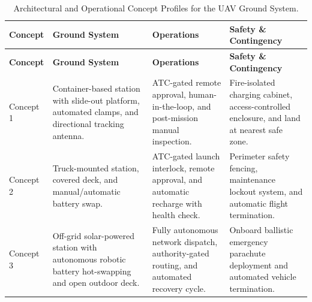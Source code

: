 {
\small
\setlength{\LTleft}{0pt}
\setlength{\LTright}{0pt}

\begin{longtable}{@{}
>{\raggedright\arraybackslash}p{}
>{\raggedright\arraybackslash}p{}
>{\raggedright\arraybackslash}p{}
>{\raggedright\arraybackslash}p{}
@{}}
\caption{Architectural and Operational Concept Profiles for the UAV Ground System.}
\label{tab:UAVConcepts} \\
\toprule
\textbf{Concept} & \textbf{Ground System} & \textbf{Operations} & \textbf{Safety \& Contingency} \\
\midrule
\endfirsthead

\toprule
\textbf{Concept} & \textbf{Ground System} & \textbf{Operations} & \textbf{Safety \& Contingency} \\
\midrule
\endhead

\bottomrule
\endfoot

Concept 1 & 
Container-based station with slide-out platform, automated clamps, and directional tracking antenna. & 
ATC-gated remote approval, human-in-the-loop, and post-mission manual inspection. & 
Fire-isolated charging cabinet, access-controlled enclosure, and land at nearest safe zone. \\
\addlinespace

Concept 2 & 
Truck-mounted station, covered deck, and manual/automatic battery swap. & 
ATC-gated launch interlock, remote approval, and automatic recharge with health check. & 
Perimeter safety fencing, maintenance lockout system, and automatic flight termination. \\
\addlinespace

Concept 3 & 
Off-grid solar-powered station with autonomous robotic battery hot-swapping and open outdoor deck. & 
Fully autonomous network dispatch, authority-gated routing, and automated recovery cycle. & 
Onboard ballistic emergency parachute deployment and automated vehicle termination. \\

\end{longtable}
}

